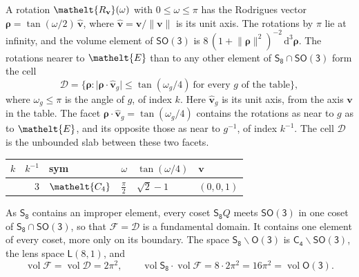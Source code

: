 \documentclass[10pt,a4paper]{article}
\numberwithin{equation}{section}
\newcommand{\eltfont}[1]{{\let\sigma\eltsigma\mathelt{#1}}}
\newcommand{\grp}[1]{\mathsf{#1}}
\newcommand{\cls}[1]{\eltfont{#1}}
\newcommand{\elt}[1]{\eltfont{#1}}
\newcommand{\dirvec}[3]{(#1, #2, #3)}
\newcommand{\unitaxis}{\hat{\mathbf{v}}}
\newcommand{\vv}{\mathbf{v}}
\newcommand{\diff}{\mathrm{d}}
\newcommand{\vol}{\operatorname{vol}}
\newcommand{\rodrigues}{\boldsymbol{\rho}}
\newcommand{\fcell}{\mathcal{D}}
\newcommand{\fdomain}{\mathcal{F}}
\newcommand{\lensspace}[2]{\mathsf{L}(#1, #2)}
\begin{document}
\leavevmode\label{n:vector.rodrigues}\label{n:vector.unitaxis}A rotation $\elt{R_{\vv}}(\omega)$ with $0 \le \omega \le \pi$ has the Rodrigues vector $\rodrigues = \tan(\omega/2)\,\unitaxis$, where $\unitaxis = \vv/\lVert\vv\rVert$ is its unit axis. The rotations by $\pi$ lie at infinity, and the volume element of \href{SO3.pdf}{$\grp{SO(3)}$} is $8\,(1 + \lVert\rodrigues\rVert^2)^{-2}\,\diff^3\rodrigues$.
\leavevmode\label{n:set.cell}The rotations nearer to $\elt{E}$ than to any other element of $\grp{S_{8}} \cap \grp{SO(3)}$ form the cell
\begin{equation}\label{e:cell}\fcell = \bigl\{\rodrigues : \lvert\rodrigues\cdot\unitaxis_g\rvert \le \tan(\omega_g/4)\ \text{for every $g$ of the table}\bigr\},\end{equation}
where $\omega_g \le \pi$ is the angle of $g$, of index $k$. Here $\unitaxis_g$ is its unit axis, from the axis $\vv$ in the table. The facet $\rodrigues\cdot\unitaxis_g = \tan(\omega_g/4)$ contains the rotations as near to $g$ as to $\elt{E}$, and its opposite those as near to $g^{-1}$, of index $k^{-1}$. The cell $\fcell$ is the unbounded slab between these two facets.
{\small{\renewcommand{\arraystretch}{1.3}\begin{longtable}{@{}rrllll@{}}\toprule
$k$ & $k^{-1}$ & sym & $\omega$ & $\tan(\omega/4)$ & $\vv$\\\midrule\endhead
\bottomrule\endfoot\endlastfoot
1 & 3 & $\cls{C_{4}}$ & $\tfrac{\pi}{2}$ & $\sqrt{2} - 1$ & $\dirvec{0}{0}{1}$\\
\bottomrule\end{longtable}}}

\leavevmode\label{n:set.fundamental}As $\grp{S_{8}}$ contains an improper element, every coset $\grp{S_{8}}Q$ meets \href{SO3.pdf}{$\grp{SO(3)}$} in one coset of $\grp{S_{8}} \cap \grp{SO(3)}$, so that $\fdomain = \fcell$ is a fundamental domain. It contains one element of every coset, more only on its boundary.
\leavevmode\label{n:set.lens}The space $\grp{S_{8}}\backslash\grp{O(3)}$ is $\grp{C_{4}}\backslash\grp{SO(3)}$, the lens space $\lensspace{8}{1}$, and
\begin{equation}\label{e:volume}\vol\fdomain = \vol\fcell = 2\pi^2,\qquad \vol\grp{S_{8}}\cdot\vol\fdomain = 8\cdot 2\pi^2 = 16\pi^2 = \vol\grp{O(3)}.\end{equation}
\end{document}
